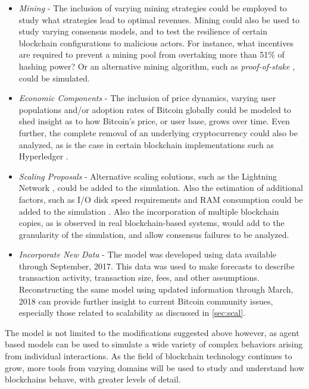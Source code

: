 \documentclass[12pt]{report}
\begin{document}
\begin{itemize}
\item \textit{Mining} - The inclusion of varying mining strategies could be employed to study what strategies lead to optimal revenues. Mining could also be used to study varying consensus models, and to test the resilience of certain blockchain configurations to malicious actors. For instance, what incentives are required to prevent a mining pool from overtaking more than 51\% of hashing power? Or an alternative mining algorithm, such as \textit{proof-of-stake} \cite{Buterin.2014}, could be simulated.
\item \textit{Economic Components} - The inclusion of price dynamics, varying user populations and/or adoption rates of Bitcoin globally could be modeled to shed insight as to how Bitcoin's price, or user base, grows over time. Even further, the complete removal of an underlying cryptocurrency could also be analyzed, as is the case in certain blockchain implementations such as Hyperledger \cite{hyperledger.}.
\item \textit{Scaling Proposals} - Alternative scaling solutions, such as the Lightning Network \cite{Poon.2016}, could be added to the simulation. Also the estimation of additional factors, such as I/O disk speed requirements and RAM consumption could be added to the simulation \cite{JamesonLopp.20170730}. Also the incorporation of multiple blockchain copies, as is observed in real blockchain-based systems, would add to the granularity of the simulation, and allow consensus failures to be analyzed.
\item \textit{Incorporate New Data} - The model was developed using data available through September, 2017. This data was used to make forecasts to describe transaction activity, transaction size, fees, and other assumptions. Reconstructing the same model using updated information through March, 2018 can provide further insight to current Bitcoin community issues, especially those related to scalability as discussed in \autoref{sec:scal}.
\end{itemize}

The model is not limited to the modifications suggested above however, as agent based models can be used to simulate a wide variety of complex behaviors arising from individual interactions. As the field of blockchain technology continues to grow, more tools from varying domains will be used to study and understand how blockchains behave, with greater levels of detail.

\end{document}
